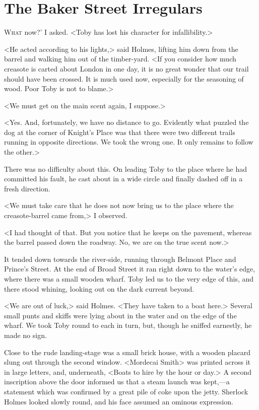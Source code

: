 \chapter{The Baker Street Irregulars}

\lettrine[ante=`]{W}{hat} now?' I asked. <Toby has lost his character for infallibility.>

\zz
<He acted according to his lights,> said Holmes, lifting him down from the barrel and walking him out of the timber-yard. <If you consider how much creasote is carted about London in one day, it is no great wonder that our trail should have been crossed. It is much used now, especially for the seasoning of wood. Poor Toby is not to blame.>

<We must get on the main scent again, I suppose.>

<Yes. And, fortunately, we have no distance to go. Evidently what puzzled the dog at the corner of Knight's Place was that there were two different trails running in opposite directions. We took the wrong one. It only remains to follow the other.>

There was no difficulty about this. On leading Toby to the place where he had committed his fault, he cast about in a wide circle and finally dashed off in a fresh direction.

<We must take care that he does not now bring us to the place where the creasote-barrel came from,> I observed.

<I had thought of that. But you notice that he keeps on the pavement, whereas the barrel passed down the roadway. No, we are on the true scent now.>

It tended down towards the river-side, running through Belmont Place and Prince's Street. At the end of Broad Street it ran right down to the water's edge, where there was a small wooden wharf. Toby led us to the very edge of this, and there stood whining, looking out on the dark current beyond.

<We are out of luck,> said Holmes. <They have taken to a boat here.> Several small punts and skiffs were lying about in the water and on the edge of the wharf. We took Toby round to each in turn, but, though he sniffed earnestly, he made no sign.

Close to the rude landing-stage was a small brick house, with a wooden placard slung out through the second window. <Mordecai Smith> was printed across it in large letters, and, underneath, <Boats to hire by the hour or day.> A second inscription above the door informed us that a steam launch was kept,—a statement which was confirmed by a great pile of coke upon the jetty. Sherlock Holmes looked slowly round, and his face assumed an ominous expression.

